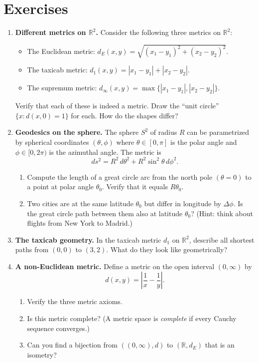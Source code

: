 \section{Exercises}

\begin{enumerate}

    \item \textbf{Different metrics on $\mathbb{R}^2$.} Consider the following three metrics on $\mathbb{R}^2$:
    \begin{itemize}
        \item The Euclidean metric: $d_E(x,y) = \sqrt{(x_1-y_1)^2 + (x_2-y_2)^2}$.
        \item The taxicab metric: $d_1(x,y) = |x_1-y_1| + |x_2-y_2|$.
        \item The supremum metric: $d_\infty(x,y) = \max\{|x_1-y_1|, |x_2-y_2|\}$.
    \end{itemize}
    Verify that each of these is indeed a metric. Draw the ``unit circle'' $\{x : d(x, 0) = 1\}$ for each. How do the shapes differ?

    \item \textbf{Geodesics on the sphere.} The sphere $S^2$ of radius $R$ can be parametrized by spherical coordinates $(\theta, \phi)$ where $\theta \in [0, \pi]$ is the polar angle and $\phi \in [0, 2\pi)$ is the azimuthal angle. The metric is
    \[
        ds^2 = R^2 \, d\theta^2 + R^2 \sin^2\theta \, d\phi^2.
    \]
    \begin{enumerate}
        \item Compute the length of a great circle arc from the north pole $(\theta = 0)$ to a point at polar angle $\theta_0$. Verify that it equals $R\theta_0$.
        \item Two cities are at the same latitude $\theta_0$ but differ in longitude by $\Delta\phi$. Is the great circle path between them also at latitude $\theta_0$? (Hint: think about flights from New York to Madrid.)
    \end{enumerate}

    \item \textbf{The taxicab geometry.} In the taxicab metric $d_1$ on $\mathbb{R}^2$, describe all shortest paths from $(0,0)$ to $(3,2)$. What do they look like geometrically?

    \item \textbf{A non-Euclidean metric.} Define a metric on the open interval $(0, \infty)$ by
    \[
        d(x,y) = \left|\frac{1}{x} - \frac{1}{y}\right|.
    \]
    \begin{enumerate}
        \item Verify the three metric axioms.
        \item Is this metric complete? (A metric space is \emph{complete} if every Cauchy sequence converges.)
        \item Can you find a bijection from $((0,\infty), d)$ to $(\mathbb{R}, d_E)$ that is an isometry?
    \end{enumerate}


\end{enumerate}
